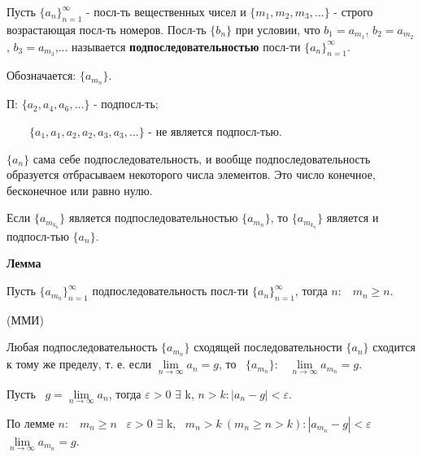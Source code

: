 \documentclass{article}
\begin{document}


Пусть $\{a_n\}^{\infty}_{n=1}$  - посл-ть вещественных чисел и $\{m_1, m_2, m_3,...\}$ - строго возрастающая посл-ть номеров. Посл-ть $\{b_n\}$ при условии, что $b_1=a_{m_1}$, $b_2=a_{m_2}$, $b_3=a_{m_3}$,... называется \textbf{подпоследовательностью} посл-ти $\{a_n\}^{\infty}_{n=1}$.

Обозначается: $\{a_{m_n}\}$.

П: $\{a_2, a_4, a_6,...\}$ - подпосл-ть;

\ \ \ \ $\{a_1, a_1, a_2, a_2, a_3, a_3,...\}$ - не является подпосл-тью.

\begin{doublespace}

\end{doublespace}
$\{a_n\}$ сама себе подпоследовательность, и вообще подпоследовательность образуется отбрасываем некоторого числа элементов. Это число конечное, бесконечное или равно нулю.

Если $\{a_{m_{k_n}}\}$ является подпоследовательностью $\{a_{m_n}\}$, то $\{a_{m_{k_n}}\}$ является и подпосл-тью $\{a_n\}$.

\begin{doublespace}

\end{doublespace}
\textbf{Лемма}

Пусть $\{a_{m_n}\}^{\infty}_{n=1}$ подпоследовательность посл-ти $\{a_n\}^{\infty}_{n=1}$, тогда \forall $n:$ \ $m_n\geq n$.

\proof (ММИ)



\theorem

Любая подпоследовательность $\{a_{m_n}\}$ сходящей последовательности $\{a_n\}$ сходится к тому же пределу, т. е. если \exists $\lim\limits_{n\to\infty}{a_n}=g$, то \forall \ $\{a_{m_n}\}:$ \ $\lim\limits_{n\to\infty}{a_{m_n}}=g$.

\proof

Пусть \exists \ $g=\lim\limits_{n\to\infty}{a_n}$, тогда \forall $\varepsilon>0$ $\exists$ k, \forall $n>k: |a_n-g|<\varepsilon$.

По лемме \forall $n:$ \ $m_n\geq n$ \implies \ \forall $\varepsilon>0$ $\exists$ k, \ \forall $m_n>k \ (m_n\geq n>k): |a_{m_n}-g|<\varepsilon$ \implies \ $\lim\limits_{n\to\infty}{a_{m_n}}=g$.
\end{document}
